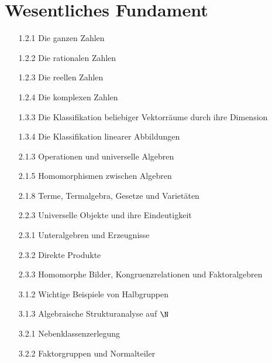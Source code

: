 \section{Wesentliches Fundament}

\begin{itemize}

  \item
  [1.2.1]
  Die ganzen Zahlen

  \item
  [1.2.2]
  Die rationalen Zahlen

  \item
  [1.2.3]
  Die reellen Zahlen

  \item
  [1.2.4]
  Die komplexen Zahlen

  \item
  [1.3.3]
  Die Klassifikation beliebiger Vektorräume durch ihre Dimension

  \item
  [1.3.4]
  Die Klassifikation linearer Abbildungen

  \item
  [2.1.3]
  Operationen und universelle Algebren

  \item
  [2.1.5]
  Homomorphismen zwischen Algebren

  \item
  [2.1.8]
  Terme, Termalgebra, Gesetze und Varietäten

  \item
  [2.2.3]
  Universelle Objekte und ihre Eindeutigkeit

  \item
  [2.3.1]
  Unteralgebren und Erzeugnisse

  \item
  [2.3.2]
  Direkte Produkte

  \item
  [2.3.3]
  Homomorphe Bilder, Kongruenzrelationen und Faktoralgebren

  \item
  [3.1.2]
  Wichtige Beispiele von Halbgruppen

  \item
  [3.1.3]
  Algebraische Strukturanalyse auf $\N$

  \item
  [3.2.1]
  Nebenklassenzerlegung

  \item
  [3.2.2]
  Faktorgruppen und Normalteiler


\end{itemize}
